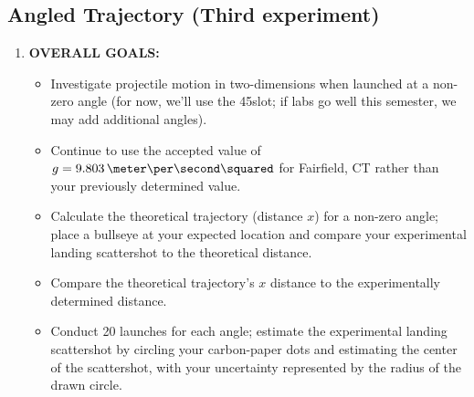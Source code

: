









\subsection{Angled Trajectory (Third experiment)}



\begin{enumerate}
\item \textbf{OVERALL GOALS:} 
\begin{itemize}
    \item Investigate projectile motion in two-dimensions when launched at a non-zero angle (for now, we'll use the 45\degree slot; if labs go well this semester, we may add additional angles).
    \item Continue to use the accepted value of $g = 9.803\,\meter\per\second\squared$ for Fairfield, CT rather than your previously determined value.
    \item Calculate the theoretical trajectory (distance $x$) for a non-zero angle; place a bullseye at your expected location and compare your experimental landing scattershot to the theoretical distance.
    \item Compare the theoretical trajectory's $x$ distance to the experimentally determined distance.
    \item Conduct 20 launches for each angle; estimate the experimental landing scattershot by circling your carbon-paper dots and estimating the center of the scattershot, with your uncertainty represented by the radius of the drawn circle.
\end{itemize}







\end{enumerate}

